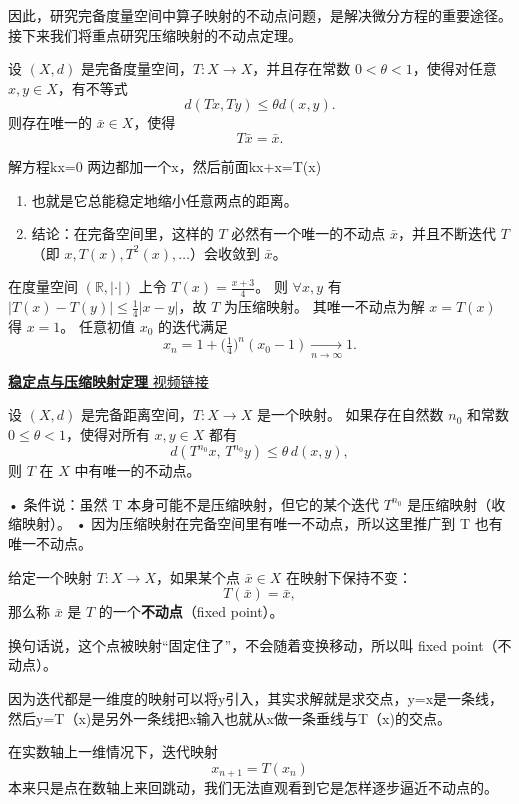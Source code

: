 因此，研究完备度量空间中算子映射的不动点问题，是解决微分方程的重要途径。接下来我们将重点研究压缩映射的不动点定理。
\begin{theorem}[压缩映射原理]
设 $(X,d)$ 是完备度量空间，$T:X \to X$，并且存在常数 $0<\theta<1$，使得对任意 $x,y \in X$，有不等式
\[
d(Tx,Ty) \leq \theta d(x,y).
\]
则存在唯一的 $\bar{x} \in X$，使得
\[
T\bar{x} = \bar{x}.
\]
\end{theorem}
解方程kx=0
两边都加一个x，然后前面kx+x=T(x)
\begin{dxtips}[压缩映射原理总结]
\begin{enumerate}

  \item 也就是它总能稳定地缩小任意两点的距离。
  \item 结论：在完备空间里，这样的 $T$ 必然有一个唯一的不动点 $\bar{x}$，并且不断迭代 $T$（即 $x, T(x), T^2(x), \dots$）会收敛到 $\bar{x}$。
\end{enumerate}

\end{dxtips}
\begin{example}[实数上的压缩映射]
在度量空间 $(\mathbb{R},|\cdot|)$ 上令 $T(x)=\frac{x+3}{4}$。
则 $\forall x,y$ 有 $|T(x)-T(y)|\le \tfrac14|x-y|$，故 $T$ 为压缩映射。
其唯一不动点为解 $x=T(x)$ 得 $x=1$。
任意初值 $x_0$ 的迭代满足
\[
x_{n}=1+\Big(\tfrac14\Big)^{n}(x_0-1)\xrightarrow[n\to\infty]{}1.
\]
\end{example}
\href{https://www.bilibili.com/video/BV1tJpizREED?vd_source=aa3cbf11c6c44a57861db6554a266722}{\textbf{稳定点与压缩映射定理} 视频链接}
\begin{theorem}[压缩映射推广]
设 $(X,d)$ 是完备距离空间，$T:X \to X$ 是一个映射。  
如果存在自然数 $n_0$ 和常数 $0 \leq \theta < 1$，使得对所有 $x,y \in X$ 都有
\[
d\!\left(T^{n_0}x,\,T^{n_0}y\right) \leq \theta\, d(x,y),
\]
则 $T$ 在 $X$ 中有唯一的不动点。
\end{theorem}
	•	条件说：虽然 T 本身可能不是压缩映射，但它的某个迭代 $T^{n_0}$ 是压缩映射（收缩映射）。
	•	因为压缩映射在完备空间里有唯一不动点，所以这里推广到 T 也有唯一不动点。

\begin{proposition}[不动点的定义]
给定一个映射 $T:X \to X$，如果某个点 $\bar{x} \in X$ 在映射下保持不变：
\[
T(\bar{x}) = \bar{x},
\]
那么称 $\bar{x}$ 是 $T$ 的一个\textbf{不动点}（fixed point）。  

换句话说，这个点被映射“固定住了”，不会随着变换移动，所以叫 fixed point（不动点）。
\end{proposition}
\begin{dxtips}
    因为迭代都是一维度的映射可以将y引入，其实求解就是求交点，y=x是一条线，然后y=T（x)是另外一条线把x输入也就从x做一条垂线与T（x)的交点。
\end{dxtips}
在实数轴上一维情况下，迭代映射
\[
x_{n+1} = T(x_n)
\]
本来只是点在数轴上来回跳动，我们无法直观看到它是怎样逐步逼近不动点的。


